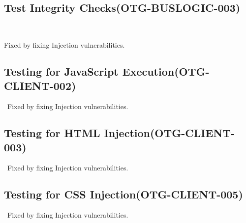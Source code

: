 \documentclass[headsepline,footsepline,footinclude=false,oneside,fontsize=11pt,paper=a4,listof=totoc,bibliography=totoc]{scrbook} %
\begin{document}
 
\subsection{Test Integrity Checks(OTG-BUSLOGIC-003)}\

Fixed by fixing Injection vulnerabilities.\\
 
 
\subsection{Testing for JavaScript Execution(OTG-CLIENT-002)}\
Fixed by fixing Injection vulnerabilities. \\

 
\subsection{Testing for HTML Injection(OTG-CLIENT-003)}\
Fixed by fixing Injection vulnerabilities.\\ 

\subsection{Testing for CSS Injection(OTG-CLIENT-005)}\
Fixed by fixing Injection vulnerabilities.
\end{document}
